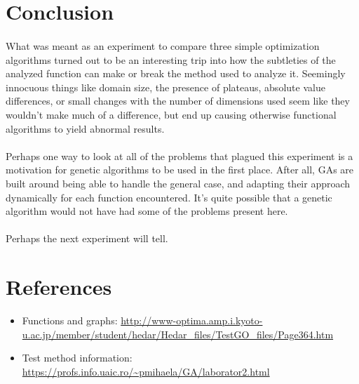 \documentclass{article}
\begin{document}
    \section{Conclusion}
    \paragraph{}
    What was meant as an experiment to compare three simple optimization algorithms turned out to be an interesting trip into how the subtleties of the analyzed function can make or break the method used to analyze it. Seemingly innocuous things like domain size, the presence of plateaus, absolute value differences, or small changes with the number of dimensions used seem like they wouldn't make much of a difference, but end up causing otherwise functional algorithms to yield abnormal results.
    \paragraph{}
    Perhaps one way to look at all of the problems that plagued this experiment is a motivation for genetic algorithms to be used in the first place. After all, GAs are built around being able to handle the general case, and adapting their approach dynamically for each function encountered. It's quite possible that a genetic algorithm would not have had some of the problems present here.
    \paragraph{}
    Perhaps the next experiment will tell.

    \newpage

    \section{References}
    \begin{itemize}
        \item Functions and graphs: \url{http://www-optima.amp.i.kyoto-u.ac.jp/member/student/hedar/Hedar_files/TestGO_files/Page364.htm}
        
        \item Test method information: \url{https://profs.info.uaic.ro/~pmihaela/GA/laborator2.html}
    \end{itemize}
\end{document}
